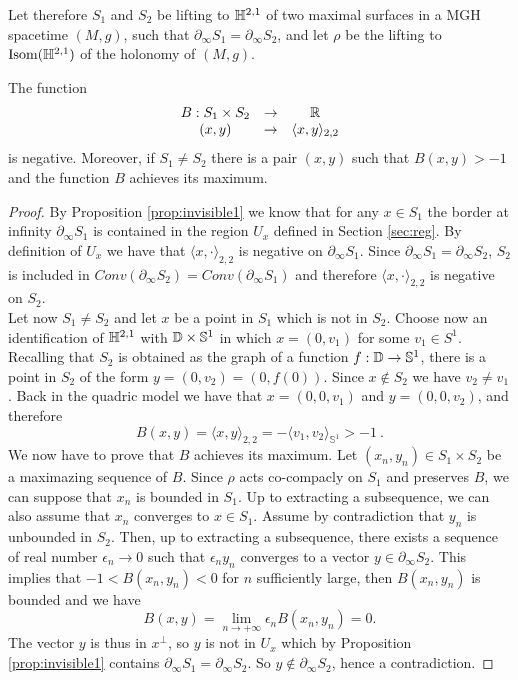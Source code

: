 Let therefore $S_1$ and $S_2$ be lifting to $\mathbb{H}^{2,1}$ of two maximal surfaces in a MGH spacetime $(M,g)$, such that $\partial_\infty S_1 = \partial_\infty S_2$, and let $\rho$ be the lifting to $\text{Isom}(\mathbb{H}^{2,1})$ of the holonomy of $(M,g)$. 
\begin{lemma}\label{lem:maxgen}
    The function 
    \[
    \begin{array}{ccc}
        B: S_1 \times S_2 & \to & \mathbb{R} \\
        (x,y) & \to & \langle x,y \rangle_{2,2}
    \end{array}
    \]
    is negative. Moreover, if $S_1 \neq S_2$ there is a pair $(x,y)$ such that $B(x,y) > -1$ and the function $B$ achieves its maximum.
\end{lemma}
\begin{proof}
    By Proposition \ref{prop:invisible1} we know that for any $x\in S_1$ the border at infinity $\partial_\infty  S_1$ is contained in the region $U_x$ defined in Section \ref{sec:reg}. By definition of $U_x$ we have that $\langle x, \cdot \rangle_{2,2}$ is negative on $\partial_\infty S_1$. Since $\partial_\infty S_1 = \partial_\infty S_2$, $S_2$ is included in $Conv(\partial_\infty S_2)= Conv(\partial_\infty S_1)$ and therefore $\langle x, \cdot \rangle_{2,2}$ is negative on $S_2$.\\
    Let now $S_1 \neq S_2$ and let $x$ be a point in $S_1$ which is not in $S_2$. Choose now an identification of $\mathbb{H}^{2,1}$ with $\mathbb{D} \times \mathbb{S}^1$ in which $x = (0,v_1)$ for some $v_1 \in S^1$. Recalling that $S_2$ is obtained as the graph of a function $f:\mathbb{D} \to \mathbb{S}^1$, there is a point in $S_2$ of the form $y=(0,v_2) = (0, f(0))$. Since $x\notin S_2$ we have $v_2 \neq v_1$. Back in the quadric model we have that $x=(0,0,v_1)$ and $y=(0,0,v_2)$, and therefore
    \[
        B(x,y)= \langle x,y \rangle _{2,2} = - \langle v_1, v_2 \rangle _{\mathbb{S}^1} > -1 \ .
    \]
    We now have to prove that $B$ achieves its maximum. Let $(x_n, y_n) \in S_1 \times S_2$  be a maximazing sequence of $B$. Since $\rho$ acts co-compacly on $S_1$ and preserves $B$, we can suppose that $x_n$ is bounded in $S_1$. Up to extracting a subsequence, we can also assume that $x_n$ converges to $x\in S_1$. Assume by contradiction that $y_n$ is unbounded in $S_2$. Then, up to extracting a subsequence, there exists a sequence of real number $\epsilon_n \to 0$ such that $\epsilon_n y_n$ converges to a vector $y\in \partial_\infty S_2$. This implies that $-1 < B(x_n, y_n) < 0$ for $n$ sufficiently large, then $B(x_n, y_n)$ is bounded and we have
    \[
        B(x,y) = \lim_{n\to +\infty} \epsilon_n B(x_n,y_n) = 0 .
    \]
    The vector $y$ is thus in $x^\perp$, so $y$ is not in $U_x$ which by Proposition \ref{prop:invisible1} contains $\partial_\infty S_1 = \partial_\infty S_2$. So $y \notin \partial_\infty S_2$, hence a contradiction.
\end{proof}
